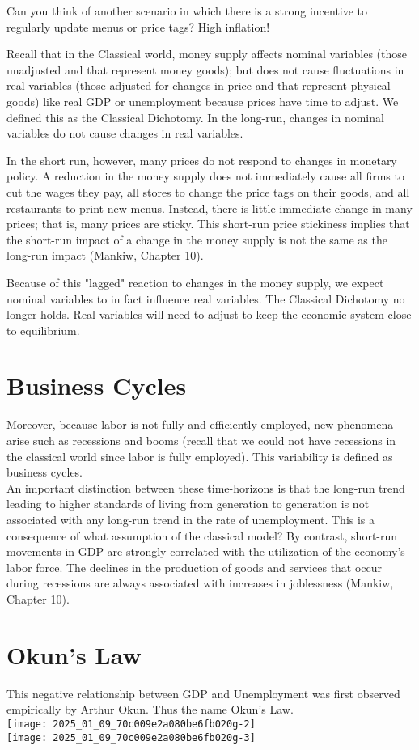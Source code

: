 \documentclass[10pt]{article}
\begin{document}
Can you think of another scenario in which there is a strong incentive to regularly update menus or price tags? High inflation!

Recall that in the Classical world, money supply affects nominal variables (those unadjusted and that represent money goods); but does not cause fluctuations in real variables (those adjusted for changes in price and that represent physical goods) like real GDP or unemployment because prices have time to adjust. We defined this as the Classical Dichotomy. In the long-run, changes in nominal variables do not cause changes in real variables.

In the short run, however, many prices do not respond to changes in monetary policy. A reduction in the money supply does not immediately cause all firms to cut the wages they pay, all stores to change the price tags on their goods, and all restaurants to print new menus. Instead, there is little immediate change in many prices; that is, many prices are sticky. This short-run price stickiness implies that the short-run impact of a change in the money supply is not the same as the long-run impact (Mankiw, Chapter 10).

Because of this "lagged" reaction to changes in the money supply, we expect nominal variables to in fact influence real variables. The Classical Dichotomy no longer holds. Real variables will need to adjust to keep the economic system close to equilibrium.

\section*{Business Cycles}
Moreover, because labor is not fully and efficiently employed, new phenomena arise such as recessions and booms (recall that we could not have recessions in the classical world since labor is fully employed). This variability is defined as business cycles.\\
An important distinction between these time-horizons is that the long-run trend leading to higher standards of living from generation to generation is not associated with any long-run trend in the rate of unemployment. This is a consequence of what assumption of the classical model? By contrast, short-run movements in GDP are strongly correlated with the utilization of the economy's labor force. The declines in the production of goods and services that occur during recessions are always associated with increases in joblessness (Mankiw, Chapter 10).

\section*{Okun's Law}
This negative relationship between GDP and Unemployment was first observed empirically by Arthur Okun. Thus the name Okun's Law.\\
\texttt{[image: 2025\_01\_09\_70c009e2a080be6fb020g-2]}\\
\texttt{[image: 2025\_01\_09\_70c009e2a080be6fb020g-3]}
\end{document}
